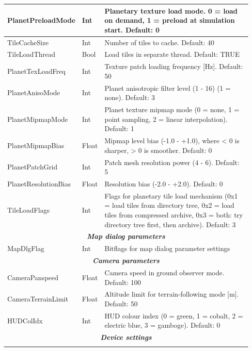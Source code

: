 \documentclass[Orbiter User Manual.tex]{subfiles}
\begin{document}
\begin{longtable}{ |p{}|p{}|p{}| }
	PlanetPreloadMode & Int & Planetary texture load mode. 0 = load on demand, 1 = preload at simulation start. Default: 0\\
	\hline\rule{0pt}{2ex}
	TileCacheSize & Int & Number of tiles to cache. Default: 40\\
	\hline\rule{0pt}{2ex}
	TileLoadThread & Bool & Load tiles in separate thread. Default: TRUE\\
	\hline\rule{0pt}{2ex}
	PlanetTexLoadFreq & Int & Texture patch loading frequency [Hz]. Default: 50\\
	\hline\rule{0pt}{2ex}
	PlanetAnisoMode & Int & Planet anisotropic filter level (1 - 16) (1 = none). Default: 3\\
	\hline\rule{0pt}{2ex}
	PlanetMipmapMode & Int & Planet texture mipmap mode (0 = none, 1 = point sampling, 2 = linear interpolation). Default: 1\\
	\hline\rule{0pt}{2ex}
	PlanetMipmapBias & Float & Mipmap level bias (-1.0 - +1.0), where < 0 is sharper, > 0 is smoother. Default: 0\\
	\hline\rule{0pt}{2ex}
	PlanetPatchGrid & Int & Patch mesh resolution power (4 - 6). Default: 5\\
	\hline\rule{0pt}{2ex}
	PlanetResolutionBias & Float & Resolution bias (-2.0 - +2.0). Default: 0\\
	\hline\rule{0pt}{2ex}
	TileLoadFlags & Int & Flags for planetary tile load mechanism (0x1 = load tiles from directory tree, 0x2 = load tiles from compressed archive, 0x3 = both: try directory tree first, then archive). Default: 3\\
	\hline
	\multicolumn{3}{|c|}{\rule{0pt}{2ex}\textbf{\textit{Map dialog parameters}}}\\
	\hline\rule{0pt}{2ex}
	MapDlgFlag & Int & Bitflags for map dialog parameter settings\\
	\hline
	\multicolumn{3}{|c|}{\rule{0pt}{2ex}\textbf{\textit{Camera parameters}}}\\
	\hline\rule{0pt}{2ex}
	CameraPanspeed & Float & Camera speed in ground observer mode. Default: 100\\
	\hline\rule{0pt}{2ex}
	CameraTerrainLimit & Float & Altitude limit for terrain-following mode [m]. Default: 50\\
	\hline\rule{0pt}{2ex}
	HUDColIdx & Int & HUD colour index (0 = green, 1 = cobalt, 2 = electric blue, 3 = gamboge). Default: 0\\
	\hline
	\multicolumn{3}{|c|}{\rule{0pt}{2ex}\textbf{\textit{Device settings}}}\\
	\hline\rule{0pt}{2ex}

\end{longtable}
\end{document}
